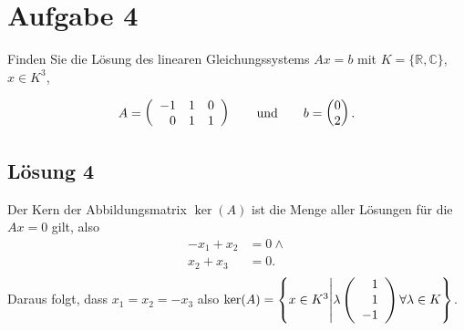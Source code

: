 \documentclass[main.tex]{subfiles}
\begin{document}
\section{Aufgabe 4}

Finden Sie die Lösung des linearen Gleichungssystems $Ax = b$ mit $K = \{\mathbb{R}, \mathbb{C}\}$, $x \in K^3$,

$$
    A = \eqmatrix{rrr}{
        -1 & 1 & 0 \\
         0 & 1 & 1 \\
    } \qquad \text{und} \qquad b= \vektor{0 \\ 2}.
$$

\subsection{Lösung 4}
Der Kern der Abbildungsmatrix $\ker (A)$ ist die Menge aller Lösungen für die $Ax = 0$ gilt, also
\begin{align*}
    -x_1 + x_2 &= 0 \land\\
     x_2 + x_3 &= 0. \\
\end{align*} 
Daraus folgt, dass $x_1 = x_2 = - x_3$ also $\ker (A) = \left\{ x\in K^3 \middle| \lambda \eqmatrix{r}{1\\ 1\\ -1\\} \forall \lambda \in K \right\}$. 
\end{document}
